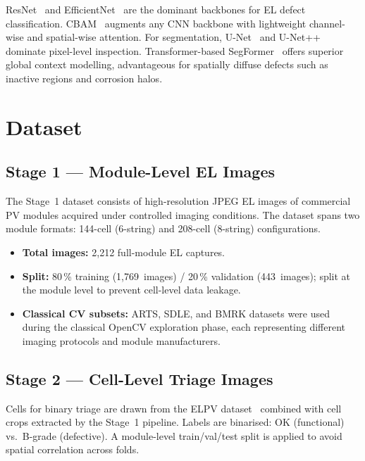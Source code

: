 \documentclass[conference]{IEEEtran}
\begin{document}
ResNet~\cite{he2016} and EfficientNet~\cite{tan2019} are the
dominant backbones for EL defect classification.
CBAM~\cite{woo2018} augments any CNN backbone with lightweight
channel-wise and spatial-wise attention.
For segmentation, U-Net~\cite{ronneberger2015} and
U-Net++~\cite{zhou2018} dominate pixel-level inspection.
Transformer-based SegFormer~\cite{xie2021} offers superior
global context modelling, advantageous for spatially diffuse
defects such as inactive regions and corrosion halos.

\section{Dataset}

\subsection{Stage 1 --- Module-Level EL Images}

The Stage~1 dataset consists of high-resolution JPEG EL images
of commercial PV modules acquired under controlled imaging
conditions.
The dataset spans two module formats: 144-cell (6-string)
and 208-cell (8-string) configurations.
\begin{itemize}
  \item \textbf{Total images:} 2{,}212 full-module EL captures.
  \item \textbf{Split:} 80\,\% training (1{,}769~images) /
        20\,\% validation (443~images); split at the module
        level to prevent cell-level data leakage.
  \item \textbf{Classical CV subsets:} ARTS, SDLE, and BMRK
        datasets were used during the classical OpenCV
        exploration phase, each representing different imaging
        protocols and module manufacturers.
\end{itemize}

\subsection{Stage 2 --- Cell-Level Triage Images}

Cells for binary triage are drawn from the ELPV
dataset~\cite{deitsch2019} combined with cell crops extracted
by the Stage~1 pipeline.
Labels are binarised: OK (functional) vs.\ B-grade (defective).
A module-level train/val/test split is applied to avoid
spatial correlation across folds.
\end{document}

